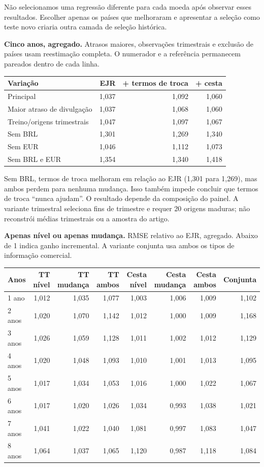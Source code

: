 \documentclass[10pt,a4paper]{article}
\newcommand{\pagina}[1]{\clearpage{\Large\bfseries\color{navy} #1}\par\vspace{6pt}}
\begin{document}
Não selecionamos uma regressão diferente para cada moeda após observar esses resultados. Escolher apenas os países que melhoraram e apresentar a seleção como teste novo criaria outra camada de seleção histórica.

\pagina{6. Robustez e componentes das extensões}
\textbf{Cinco anos, agregado.} Atrasos maiores, observações trimestrais e exclusão de países usam reestimação completa. O numerador e a referência permanecem pareados dentro de cada linha.

{\normalsize
\begin{center}\begin{tabular}{lrrr}\toprule
Variação & EJR & + termos de troca & + cesta \\ \midrule
Principal & 1,037 & 1,092 & 1,060 \\
Maior atraso de divulgação & 1,037 & 1,068 & 1,060 \\
Treino/origens trimestrais & 1,047 & 1,097 & 1,067 \\
Sem BRL & 1,301 & 1,269 & 1,340 \\
Sem EUR & 1,046 & 1,112 & 1,073 \\
Sem BRL e EUR & 1,354 & 1,340 & 1,418 \\\bottomrule\end{tabular}\end{center}}

Sem BRL, termos de troca melhoram em relação ao EJR (1,301 para 1,269), mas ambos perdem para nenhuma mudança. Isso também impede concluir que termos de troca ``nunca ajudam''. O resultado depende da composição do painel. A variante trimestral seleciona fins de trimestre e requer 20 origens maduras; não reconstrói médias trimestrais ou a amostra do artigo.

\textbf{Apenas nível ou apenas mudança.} RMSE relativo ao EJR, agregado. Abaixo de 1 indica ganho incremental. A variante conjunta usa ambos os tipos de informação comercial.

{\footnotesize
\begin{center}\begin{tabular}{lrrrrrrr}\toprule
Anos & TT nível & TT mudança & TT ambos & Cesta nível & Cesta mudança & Cesta ambos & Conjunta \\ \midrule
1 ano & 1,012 & 1,035 & 1,077 & 1,003 & 1,006 & 1,009 & 1,102 \\
2 anos & 1,020 & 1,070 & 1,142 & 1,012 & 1,000 & 1,009 & 1,168 \\
3 anos & 1,026 & 1,059 & 1,128 & 1,011 & 1,002 & 1,012 & 1,129 \\
4 anos & 1,020 & 1,048 & 1,093 & 1,010 & 1,001 & 1,013 & 1,095 \\
5 anos & 1,017 & 1,034 & 1,053 & 1,016 & 1,000 & 1,022 & 1,067 \\
6 anos & 1,017 & 1,020 & 1,026 & 1,034 & 0,993 & 1,038 & 1,021 \\
7 anos & 1,041 & 1,022 & 1,040 & 1,081 & 0,997 & 1,083 & 1,047 \\
8 anos & 1,064 & 1,037 & 1,065 & 1,120 & 0,987 & 1,118 & 1,084 \\\bottomrule\end{tabular}\end{center}}
\end{document}
